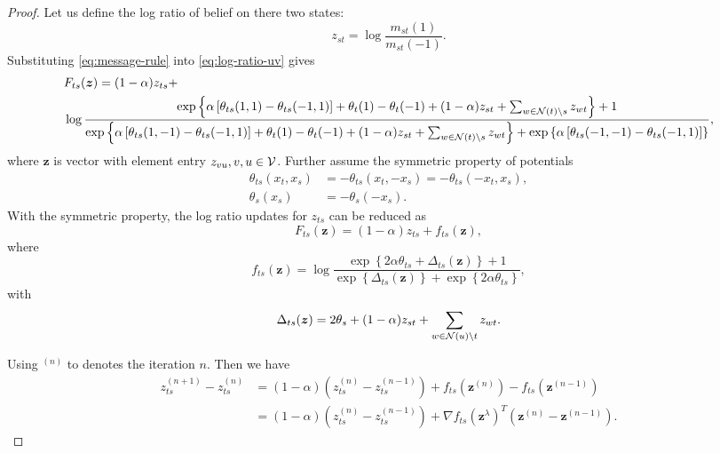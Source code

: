 \documentclass[conference,onecolumn]{IEEEtran}
\begin{document}
\begin{proof}

  Let us define the log ratio of belief on there two states:
  \begin{equation}\label{eq:log-ratio-uv}
    z_{st} = \log\frac{m_{st}(1)}{m_{st}(-1)}.
  \end{equation}
  Substituting \eqref{eq:message-rule} into \eqref{eq:log-ratio-uv} gives
  \begin{align}
    &F_{ts}(\bm{z}) = (1- \alpha)z_{ts} + \\
    &\log\frac{\exp\left\{ \alpha\left[ \theta_{ts}(1,1) - \theta_{ts}(-1,1) \right] + \theta_t(1) - \theta_t(-1) + (1 - \alpha)z_{st} + \sum_{w\in \mathcal{N}(t)\backslash s} z_{wt} \right\}+1}
      {\exp\left\{ \alpha\left[ \theta_{ts}(1,-1) - \theta_{ts}(-1,1) \right] + \theta_t(1) - \theta_t(-1) + (1 - \alpha)z_{st} + \sum_{w\in \mathcal{N}(t)\backslash s} z_{wt} \right\} +
      \exp\left\{ \alpha\left[ \theta_{ts}(-1,-1) - \theta_{ts}(-1,1) \right] \right\}},
  \end{align}
  where $\bm{z}$ is vector with element entry $z_{vu}, v,u \in \mathcal{V}$.
  Further assume the symmetric property of potentials
  \begin{align}
    \theta_{ts}(x_t, x_s) &= -\theta_{ts}(x_t, -x_s) = -\theta_{ts}(-x_t, x_s), \\
    \theta_{s}(x_s) &= - \theta_s(-x_s).
  \end{align}
  With the symmetric property, the log ratio updates for $z_{ts}$ can be reduced as
  \begin{equation}\label{eq:ratio-update}
    F_{ts}(\bm{z}) = (1-\alpha) z_{ts} + f_{ts}(\bm{z}),
  \end{equation}
  where
  \begin{equation}
    f_{ts}(\bm{z}) = \log\frac{\exp\left\{ 2 \alpha \theta_{ts} + \Delta_{ts}(\bm{z}) \right\}+1}
    {\exp\left\{ \Delta_{ts}(\bm{z}) \right\} +
      \exp\left\{ 2 \alpha \theta_{ts} \right\}},
  \end{equation}
  with
  \begin{equation}
    \Delta_{ts}(\bm{z}) = 2 \theta_s + (1 - \alpha) z_{st} + \sum_{w\in \mathcal{N}(u)\backslash t} z_{wt}.
  \end{equation}

  Using $^{(n)}$ to denotes the iteration $n$. Then we have
  \begin{align}\label{eq:ratio_diff_at_n}
    z_{ts}^{(n+1)} - z_{ts}^{(n)} &= (1-\alpha) (z_{ts}^{(n)} - z_{ts}^{(n-1)}) + f_{ts}(\bm{z}^{(n)}) - f_{ts}(\bm{z}^{(n-1)}) \nonumber \\
                                  & = (1-\alpha) (z_{ts}^{(n)} - z_{ts}^{(n-1)}) + \nabla f_{ts}(\bm{z}^{\lambda})^{T} (\bm{z}^{(n)} - \bm{z}^{(n-1)}).
  \end{align}


\end{proof}
\end{document}
